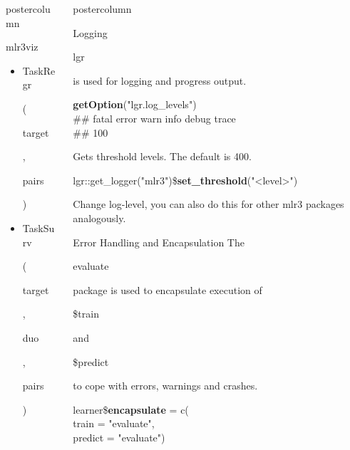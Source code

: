 \documentclass{beamer}
\newlength{\columnheight} %
\newcommand{\codeinline}[1]{\begin{codeboxinline}#1\end{codeboxinline}}
\begin{document}
\begin{withoutheader}
\begin{frame}[fragile]{}
\begin{columns}
\begin{column}{.245\textwidth}
\begin{beamercolorbox}[center]{postercolumn}
\begin{minipage}{.98\textwidth}
{\begin{myblock}{mlr3viz}
\begin{itemize}
							\item \codeinline{TaskRegr} (\codeinline{target}, \codeinline{pairs})
							\item \codeinline{TaskSurv} (\codeinline{target}, \codeinline{duo}, \codeinline{pairs})
						\end{itemize}
					\end{myblock}
					\vfill
					}
				\end{minipage}
			\end{beamercolorbox}
		\end{column}
		\begin{column}{.245\textwidth}
			\begin{beamercolorbox}[center]{postercolumn}
				\begin{minipage}{.98\textwidth}
					\parbox[t][\columnheight]{\textwidth}{
						\begin{myblock}{Logging}
							\codeinline{lgr} is used for logging and progress output.
							\\
							\begin{codeboxmultiline}[width=23.1cm]
								\textbf{getOption}("lgr.log\_levels")\\
								\#\# fatal error  warn  info debug trace\\ 
								\#\# 100 \space{} \space{}  \space 500 \space{}
							\end{codeboxmultiline}
							Gets threshold levels. The default is 400. 
							\\
							\begin{codeboxmultiline}[width=25cm]
								\footnotesize{
								lgr::get\_logger("mlr3")\$\textbf{set\_threshold}("<level>")
							}
							\end{codeboxmultiline}
							Change log-level, you can also do this for other mlr3 packages analogously.
						\end{myblock}
						\begin{myblock}{Error Handling and Encapsulation}
							The \codeinline{evaluate} package is used to encapsulate execution of \codeinline{\$train} and \codeinline{\$predict} to cope with errors, warnings and crashes.
							\\
							\begin{codeboxmultiline}[width=16cm]
								learner\$\textbf{encapsulate} = c(\\
								\hspace*{1ex} train = "evaluate", \\
								\hspace*{1ex} predict = "evaluate")

\end{codeboxmultiline}
\end{myblock}}
\end{minipage}
\end{beamercolorbox}
\end{column}
\end{columns}
\end{frame}
\end{withoutheader}
\end{document}
